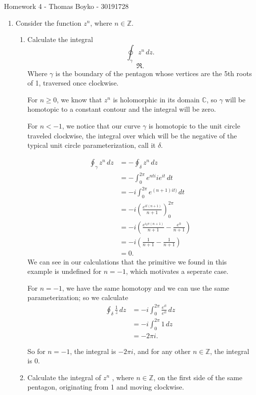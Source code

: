 \documentclass{article}
\begin{document}
    \huge Homework 4 - Thomas Boyko - 30191728
    \normalsize
\begin{enumerate} 
\item Consider the function $z^n$, where $n \in  \mathbb{Z}$.
\begin{enumerate}[label= (\alph*)] 
    \item Calculate the integral 
        \[
            \oint_{\gamma}z^{n} \, dz 
        .\] 
        \[
        \Re
        .\] 
        Where $\gamma$ is the boundary of the
pentagon whose vertices are the 5th roots of 1, traversed once
clockwise.

For $n\ge 0$, we know that $z^{n}$ is holomorphic in its domain $\mathbb{C}$, so $\gamma$ will be homotopic to
a constant contour and the integral will be zero.

For $n<-1$, we notice that our curve $\gamma$ is homotopic to the unit circle traveled clockwise, the integral over which will be
the negative of the typical unit circle parameterization, call it $\delta$.

\begin{align*}
    \oint_{\gamma}z^{n} \, dz &= -\oint_{\delta} z^{n} \, d z  \\
    &= -\int_{0}^{2\pi} e^{nti}ie^{it} \, d t  \\
    &= -i\int_{0}^{2\pi} e^{(n+1)it)}\, d t  \\
    &= -i \left( \frac{e^{it(n+1)}}{n+1} \right)_{0}^{2\pi} \\
    &= -i\left( \frac{e^{i_2\pi(n+1)}}{n+1}-\frac{e^{0}}{n+1} \right)  \\
    &= -i\left(\frac{1}{n+1}-\frac{1}{n+1}\right) \\
    &= 0
.\end{align*}
We can see in our calculations that the primitive we found in this example is undefined for $n=-1$, which
motivates a seperate case.

For $n=-1$, we have the same homotopy and we can use the same parameterization; so we calculate
\begin{align*}
    \oint_{\delta} \frac{1}{z} \, d z &= -i\int_{0}^{2\pi} \frac{e^{it}}{e^{it}} \, d z  \\
    &= -i \int_{0}^{2\pi} 1 \, d z  \\
    &= -2\pi i 
.\end{align*}

So for $n=-1$, the integral is $-2\pi i$, and for any other $n\in \mathbb{Z}$, the integral is 0.

\item Calculate the integral of $z^n$ , where $n \in \mathbb{Z}$, on the first side of the same pentagon, originating from 1 and moving clockwise.


\end{enumerate}
\end{enumerate}
\end{document}
